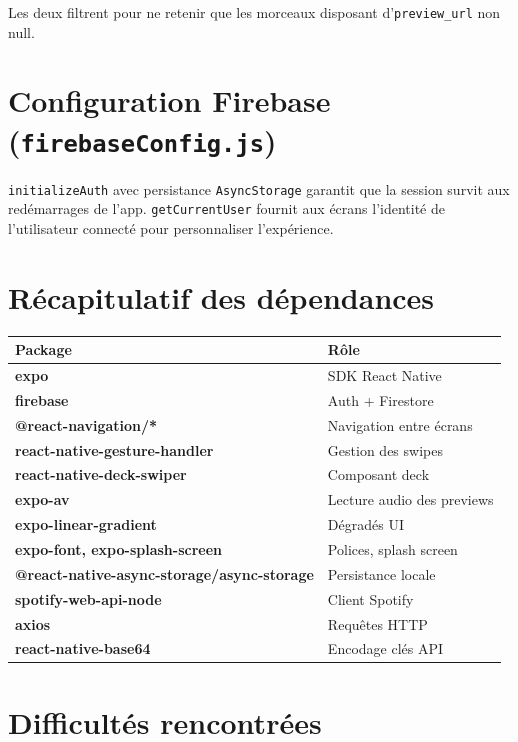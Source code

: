 \documentclass[11pt,a4paper]{article}
\begin{document}
Les deux filtrent pour ne retenir que les morceaux disposant d'\texttt{preview\_url} non null.

\section{Configuration Firebase (\texttt{firebaseConfig.js})}

\texttt{initializeAuth} avec persistance \texttt{AsyncStorage} garantit que la session survit aux redémarrages de l'app. \texttt{getCurrentUser} fournit aux écrans l'identité de l'utilisateur connecté pour personnaliser l'expérience.

\section{Récapitulatif des dépendances}

\renewcommand{\arraystretch}{1.25}
\begin{tabularx}{\linewidth}{@{}>{\bfseries\ttfamily}l X@{}}
\toprule
\rowcolor{light} \normalfont\textbf{Package} & Rôle \\ \midrule
expo                      & SDK React Native \\
firebase                  & Auth + Firestore \\
@react-navigation/*       & Navigation entre écrans \\
react-native-gesture-handler & Gestion des swipes \\
react-native-deck-swiper  & Composant deck \\
expo-av                   & Lecture audio des previews \\
expo-linear-gradient      & Dégradés UI \\
expo-font, expo-splash-screen & Polices, splash screen \\
@react-native-async-storage/async-storage & Persistance locale \\
spotify-web-api-node      & Client Spotify \\
axios                     & Requêtes HTTP \\
react-native-base64       & Encodage clés API \\
\bottomrule
\end{tabularx}

\section{Difficultés rencontrées}
\end{document}
